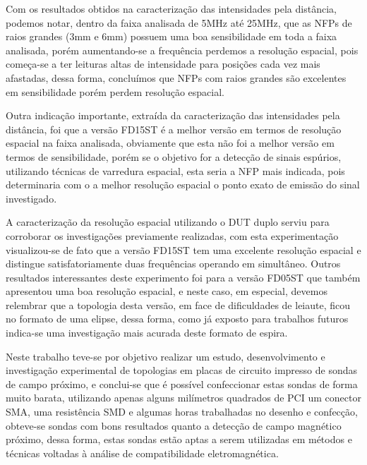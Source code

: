 Com os resultados obtidos na caracterização das intensidades pela distância, podemos notar, dentro da faixa analisada de 5MHz até 25MHz, que as NFPs de raios grandes (3mm e 6mm) possuem uma boa sensibilidade em toda a faixa analisada, porém aumentando-se a frequência perdemos a resolução espacial, pois começa-se a ter leituras altas de intensidade para posições cada vez mais afastadas, dessa forma, concluímos que NFPs com raios grandes são excelentes em sensibilidade porém perdem resolução espacial.

Outra indicação importante, extraída da caracterização das intensidades pela distância, foi que a versão FD15ST é a melhor versão em termos de resolução espacial na faixa analisada, obviamente que esta não foi a melhor versão em termos de sensibilidade, porém se o objetivo for a detecção de sinais espúrios, utilizando técnicas de varredura espacial, esta seria a NFP mais indicada, pois determinaria com o a melhor resolução espacial o ponto exato de emissão do sinal investigado.

A caracterização da resolução espacial utilizando o DUT duplo serviu para corroborar os investigações previamente realizadas, com esta experimentação visualizou-se de fato que a versão FD15ST tem uma excelente resolução espacial e distingue satisfatoriamente duas frequências operando em simultâneo. Outros resultados interessantes deste experimento foi para a versão FD05ST que também apresentou uma boa resolução espacial, e neste caso, em especial, devemos relembrar que a topologia desta versão, em face de dificuldades de leiaute, ficou no formato de uma elipse, dessa forma, como já exposto para trabalhos futuros indica-se uma investigação mais acurada deste formato de espira.


Neste trabalho teve-se por objetivo realizar um estudo, desenvolvimento e investigação experimental de topologias em placas de circuito impresso de sondas de campo próximo, e conclui-se que é possível confeccionar estas sondas de forma muito barata, utilizando apenas alguns milímetros quadrados de PCI um conector SMA, uma resistência SMD e algumas horas trabalhadas no desenho e confecção, obteve-se sondas com bons resultados quanto a detecção de campo magnético próximo, dessa forma, estas sondas estão aptas a serem utilizadas em métodos e técnicas voltadas à análise de compatibilidade eletromagnética.
